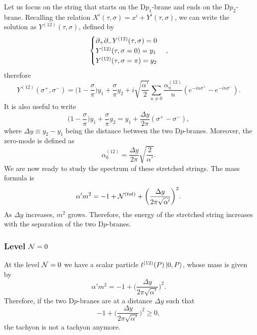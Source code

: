 Let us focus on the string that starts on the D$p_1$-brane and ends on the D$p_2$-brane. Recalling the relation $X^i(\tau,\sigma) = x^i + Y^i(\tau,\sigma)$, we can write the solution as $Y^{(12)}(\tau,\sigma)$, defined by 
\begin{equation}
    \begin{cases}
        \partial_+\partial_-Y^{(12)}(\tau,\sigma) = 0 \\
        Y^{(12)}(\tau,\sigma = 0) = y_1 \\
        Y^{(12)}(\tau,\sigma = \pi) = y_2
    \end{cases},
\end{equation}
therefore 
\begin{equation}
    Y^{(12)}(\sigma^+,\sigma^-) = \bigg(1 - \frac{\sigma}{\pi}\bigg)y_1 + \frac{\sigma}{\pi}y_2 + i\sqrt{\frac{\alpha'}{2}}\sum_{n \neq 0}\frac{\alpha_n^{(12)}}{n}(e^{-in\sigma^+} - e^{-in\sigma^-}).
\end{equation}
It is also useful to write
\begin{equation}
    \bigg(1 - \frac{\sigma}{\pi}\bigg)y_1 + \frac{\sigma}{\pi}y_2 = y_1 + \frac{\Delta y}{2\pi}(\sigma^+ - \sigma^-),
\end{equation}
where $\Delta y \equiv y_2 - y_1$ being the distance between the two D$p$-branes. Moreover, the zero-mode is defined as 
\begin{equation}
    \alpha_0^{(12)} = \frac{\Delta y}{2\pi}\sqrt{\frac{2}{\alpha'}}.
\end{equation}
We are now ready to study the spectrum of these stretched strings. The mass formula is 
\begin{equation}
    \alpha'm^2 = - 1 + \mathcal{N}^{(tot)} + \bigg(\frac{\Delta y}{2\pi\sqrt{\alpha'}}\bigg)^2.
\end{equation}
As $\Delta y$ increases, $m^2$ grows. Therefore, the energy of the stretched string increases with the separation of the two D$p$-branes. 

\subsubsection{Level \texorpdfstring{$\mathcal{N} = 0$}{N = 0}}
At the level $\mathcal{N} = 0$ we have a scalar particle $t^{(12)}(P)\ket{0,P}$, whose mass is given by
\begin{equation}
    \alpha'm^2 = -1 + \bigg(\frac{\Delta y}{2\pi\sqrt{\alpha'}}\bigg)^2.
\end{equation}
Therefore, if the two D$p$-branes are at a distance $\Delta y$ such that 
\begin{equation}
    -1 + \bigg(\frac{\Delta y}{2\pi\sqrt{\alpha'}}\bigg)^2 \ge 0,
\end{equation}
the tachyon is not a tachyon anymore. 


